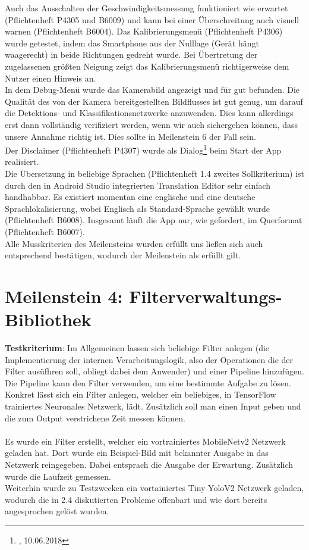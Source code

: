 \documentclass[12pt,a4paper,ngerman,enabledeprecatedfontcommands]{scrreprt}
\begin{document}
Auch das Ausschalten der Geschwindigkeitsmessung funktioniert wie erwartet (Pflichtenheft P4305 und B6009) und kann bei einer Überschreitung auch visuell warnen (Pflichtenheft B6004).
Das Kalibrierungsmenü (Pflichtenheft P4306) wurde getestet, indem das \gls{Smartphone} aus der Nulllage (Gerät hängt waagerecht) in beide Richtungen gedreht wurde. Bei Übertretung der zugelassenen größten Neigung zeigt das Kalibrierungsmenü richtigerweise dem \gls{Nutzer} einen Hinweis an.\\
In dem Debug-Menü wurde das Kamerabild angezeigt und für gut befunden. Die Qualität des von der Kamera bereitgestellten Bildflusses ist gut genug, um darauf die Detektions- und Klassifikationsnetzwerke anzuwenden. Dies kann allerdings erst dann vollständig verifiziert werden, wenn wir auch sichergehen können, dass unsere Annahme richtig ist. Dies sollte in Meilenstein 6 der Fall sein.\\
Der Disclaimer (Pflichtenheft P4307) wurde als Dialog\footnote{, 10.06.2018} beim Start der \gls{App} realisiert.\\
Die Übersetzung in beliebige Sprachen (Pflichtenheft 1.4 zweites Sollkriterium) ist durch den in Android Studio integrierten Translation Editor sehr einfach handhabbar. Es existiert momentan eine englische und eine deutsche Sprachlokalisierung, wobei Englisch als Standard-Sprache gewählt wurde (Pflichtenheft B6008).
Insgesamt läuft die App nur, wie gefordert, im Querformat (Pflichtenheft B6007).\\
Alle Musskriterien des Meilensteins wurden erfüllt uns ließen sich auch entsprechend bestätigen, wodurch der Meilenstein als erfüllt gilt.\\

\section{Meilenstein 4: Filterverwaltungs-Bibliothek}
\textbf{Testkriterium}: Im Allgemeinen lassen sich beliebige Filter anlegen (die Implementierung der internen Verarbeitungslogik, also der Operationen die der Filter ausüfhren soll, obliegt dabei dem Anwender) und einer Pipeline hinzufügen. Die Pipeline kann den Filter verwenden, um eine bestimmte Aufgabe zu lösen. Konkret lässt sich ein Filter anlegen, welcher ein beliebiges, in TensorFlow trainiertes \gls{Neuronales Netzwerk}, lädt. Zusätzlich soll man einen Input geben und die zum Output verstrichene Zeit messen können.\\
\\
Es wurde ein Filter erstellt, welcher ein vortrainiertes MobileNetv2 Netzwerk geladen hat. Dort wurde ein Beispiel-Bild mit bekannter Ausgabe in das Netzwerk reingegeben. Dabei entsprach die Ausgabe der Erwartung. Zusätzlich wurde die Laufzeit gemessen. \\
Weiterhin wurde zu Testzwecken ein vortainiertes \glqq{}Tiny YoloV2\grqq{}\cite{DBLP:journals/corr/RedmonF16} Netzwerk geladen, wodurch die in 2.4 diskutierten Probleme offenbart und wie dort bereits angesprochen gelöst wurden.\\
\end{document}
